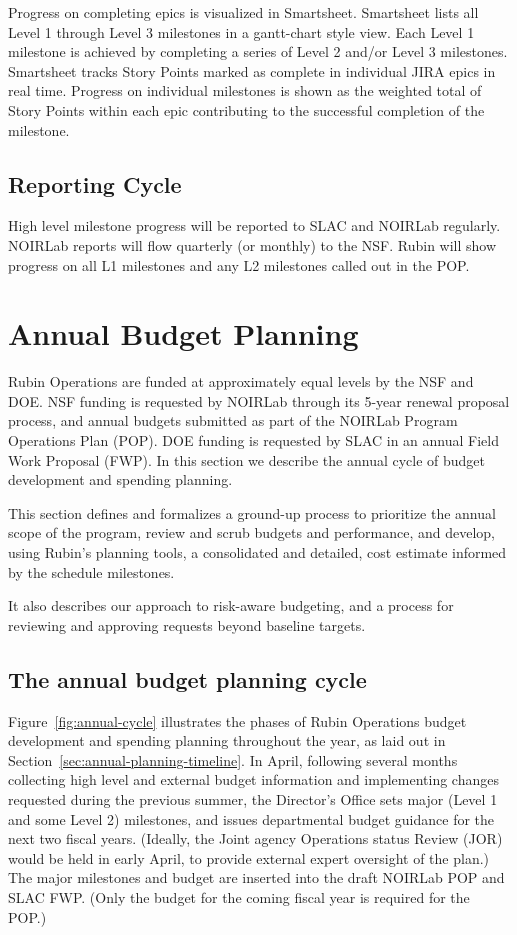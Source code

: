 \begin{itemize}
Progress on completing epics is visualized in Smartsheet.
Smartsheet lists all Level 1 through Level 3 milestones in a gantt-chart style view.
Each Level 1 milestone is achieved by completing a series of Level 2 and/or Level 3 milestones.
Smartsheet tracks Story Points marked as complete in individual \gls{JIRA} epics in real time.
Progress on individual milestones is shown as the weighted total of Story Points within each epic contributing to the successful completion of the milestone.

\subsection{Reporting Cycle}

High level milestone progress will be reported to SLAC and NOIRLab regularly.
NOIRLab reports will flow quarterly (or monthly) to the NSF.
Rubin will show progress on all L1 milestones and any L2 milestones called out in the POP.

\section{Annual Budget Planning}
\label{sec:annual-cycle}

Rubin Operations are funded at approximately equal levels by the NSF and DOE. NSF funding is requested by NOIRLab through its 5-year renewal proposal process, and annual budgets submitted as part of the NOIRLab Program Operations Plan (POP). DOE funding is requested by SLAC in an annual Field Work Proposal (FWP). In this section we describe the annual cycle of budget development and spending planning.

This section defines and formalizes a ground-up process to
prioritize the annual scope of the program,
review and scrub budgets and performance,
and develop, using Rubin's planning tools, a consolidated and detailed, cost estimate informed by the schedule milestones.

It also describes our approach to risk-aware budgeting, and a process for reviewing and approving requests beyond baseline targets.


\subsection{The annual budget planning cycle}

Figure~\ref{fig:annual-cycle} illustrates the phases of Rubin Operations budget development and spending planning throughout the year, as laid out in Section~\ref{sec:annual-planning-timeline}.
In April, following several months collecting high level and external budget information and implementing changes requested during the previous summer, the Director's Office sets major (Level 1 and some Level 2) milestones, and issues departmental budget guidance for the next two fiscal years.
(Ideally, the Joint agency Operations status Review (JOR) would be held in early April, to provide external expert oversight of the plan.)
The major milestones and budget are inserted into the draft NOIRLab POP and SLAC FWP.
(Only the budget for the coming fiscal year is required for the POP.)


\end{itemize}

